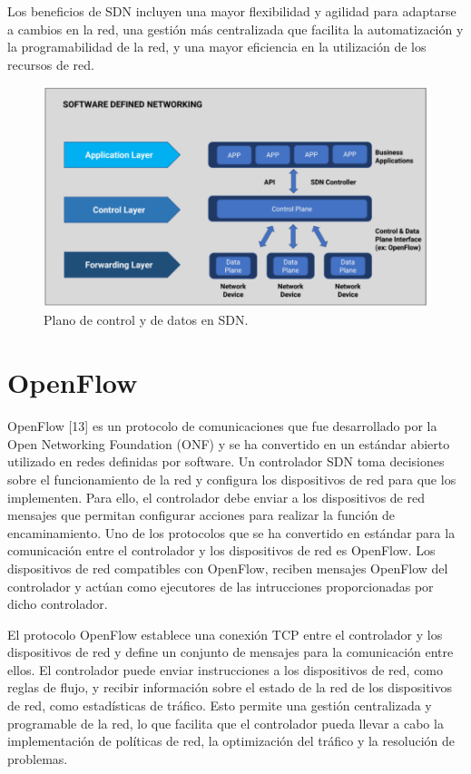\documentclass[a4paper, 12pt]{book}
\begin{document}
	Los beneficios de SDN incluyen una mayor flexibilidad y agilidad para adaptarse a cambios en la red, una gestión más centralizada que facilita la automatización y la programabilidad de la red, y una mayor eficiencia en la utilización de los recursos de red.
	
	
	\begin{figure}[H]
		\centering
		\includegraphics[width=14cm, keepaspectratio]{img/SDN}
		\caption{Plano de control y de datos en SDN.}
		\label{figura:SDN}
	\end{figure}
	
	\section{OpenFlow}
	\label{sec:openflow}
	
	
	OpenFlow [13] es un protocolo de comunicaciones que fue desarrollado por la Open Networking Foundation (ONF) y se ha convertido en un estándar abierto utilizado en redes definidas por software.
	Un controlador SDN toma decisiones sobre el funcionamiento de la red y configura los dispositivos de red para que los implementen. Para ello, el controlador debe enviar a los dispositivos de red mensajes que permitan configurar acciones para realizar la función de encaminamiento. Uno de los protocolos que se ha convertido en estándar para la comunicación entre el controlador y los dispositivos de red es OpenFlow. Los dispositivos de red compatibles con OpenFlow, reciben mensajes  OpenFlow del controlador y actúan como ejecutores de las intrucciones proporcionadas por dicho controlador.
	
	El protocolo OpenFlow establece una conexión TCP entre el controlador y los dispositivos de red  y define un conjunto de mensajes para la comunicación entre ellos. El controlador puede enviar instrucciones a los dispositivos de red, como reglas de flujo, y recibir información sobre el estado de la red de los dispositivos de red, como estadísticas de tráfico. Esto permite una gestión centralizada y programable de la red, lo que facilita que el controlador pueda llevar a cabo la implementación de políticas de red, la optimización del tráfico y la resolución de problemas.
\end{document}
